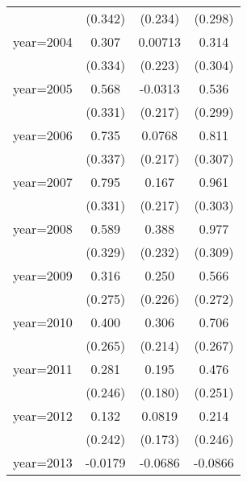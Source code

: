 {\begin{tabular}{l*{3}{c}}
                    &     (0.342)         &     (0.234)         &     (0.298)         \\
[1em]
year=2004           &       0.307         &     0.00713         &       0.314         \\
                    &     (0.334)         &     (0.223)         &     (0.304)         \\
[1em]
year=2005           &       0.568         &     -0.0313         &       0.536         \\
                    &     (0.331)         &     (0.217)         &     (0.299)         \\
[1em]
year=2006           &       0.735\sym{*}  &      0.0768         &       0.811\sym{*}  \\
                    &     (0.337)         &     (0.217)         &     (0.307)         \\
[1em]
year=2007           &       0.795\sym{*}  &       0.167         &       0.961\sym{**} \\
                    &     (0.331)         &     (0.217)         &     (0.303)         \\
[1em]
year=2008           &       0.589         &       0.388         &       0.977\sym{**} \\
                    &     (0.329)         &     (0.232)         &     (0.309)         \\
[1em]
year=2009           &       0.316         &       0.250         &       0.566\sym{*}  \\
                    &     (0.275)         &     (0.226)         &     (0.272)         \\
[1em]
year=2010           &       0.400         &       0.306         &       0.706\sym{*}  \\
                    &     (0.265)         &     (0.214)         &     (0.267)         \\
[1em]
year=2011           &       0.281         &       0.195         &       0.476         \\
                    &     (0.246)         &     (0.180)         &     (0.251)         \\
[1em]
year=2012           &       0.132         &      0.0819         &       0.214         \\
                    &     (0.242)         &     (0.173)         &     (0.246)         \\
[1em]
year=2013           &     -0.0179         &     -0.0686         &     -0.0866         \\

\end{tabular}}
